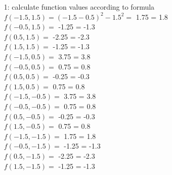 \documentclass[a4paper]{article}
\begin{document}
\begin{enumerate}
	\item[1:] calculate function values according to formula \\
	 
				$f(-1.5, 1.5) = (-1.5 - 0.5)^{2} - 1.5^{2} =$ 1.75 = 1.8\\
				$f(-0.5, 1.5) =$ -1.25 = -1.3\\
				$f(0.5, 1.5) =$ -2.25 = -2.3\\
				$f(1.5, 1.5) =$ -1.25 = -1.3\\
				$f(-1.5, 0.5) =$ 3.75 = 3.8\\
				$f(-0.5, 0.5) =$ 0.75 = 0.8\\
				$f(0.5, 0.5) =$ -0.25 = -0.3\\
				$f(1.5, 0.5) =$ 0.75 = 0.8\\
				$f(-1.5, -0.5) =$ 3.75 = 3.8\\
				$f(-0.5, -0.5) =$ 0.75 = 0.8\\
				$f(0.5, -0.5) =$ -0.25 = -0.3\\
				$f(1.5, -0.5) =$ 0.75 = 0.8 \\
				$f(-1.5, -1.5) =$ 1.75 = 1.8 \\
				$f(-0.5, -1.5) =$ -1.25 = -1.3\\
				$f(0.5, -1.5) =$ -2.25 = -2.3\\
				$f(1.5, -1.5) =$ -1.25 = -1.3\\
				

\end{enumerate}
\end{document}
